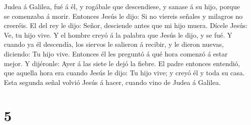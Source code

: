 Judea á Galilea, fué á él, y rogábale que descendiese, y sanase á su
hijo, porque se comenzaba á morir.  Entonces Jesús le dijo:
Si no viereis señales y milagros no creeréis.  El del rey
le dijo: Señor, desciende antes que mi hijo muera.  Dícele
Jesús: Ve, tu hijo vive. Y el hombre creyó á la palabra que Jesús le
dijo, y se fué.  Y cuando ya él descendía, los siervos le
salieron á recibir, y le dieron nuevas, diciendo: Tu hijo vive.
 Entonces él les preguntó á qué hora comenzó á estar mejor.
Y dijéronle: Ayer á las siete le dejó la fiebre.  El padre
entonces entendió, que aquella hora era cuando Jesús le dijo: Tu hijo
vive; y creyó él y toda su casa.  Esta segunda señal volvió
Jesús á hacer, cuando vino de Judea á Galilea.

\hypertarget{section-4}{%
\section{5}\label{section-4}}

